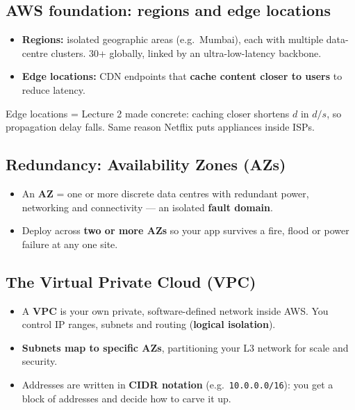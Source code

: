 \subsection{AWS foundation: regions and edge locations}
\begin{itemize}
  \item \textbf{Regions:} isolated geographic areas (e.g.\ Mumbai), each with multiple data-centre clusters. 30+ globally, linked by an ultra-low-latency backbone.
  \item \textbf{Edge locations:} CDN endpoints that \textbf{cache content closer to users} to reduce latency.
\end{itemize}
Edge locations = Lecture 2 made concrete: caching closer shortens $d$ in $d/s$, so propagation delay falls. Same reason Netflix puts appliances inside ISPs.

\subsection{Redundancy: Availability Zones (AZs)}
\begin{itemize}
  \item An \textbf{AZ} = one or more discrete data centres with redundant power, networking and connectivity --- an isolated \textbf{fault domain}.
  \item Deploy across \textbf{two or more AZs} so your app survives a fire, flood or power failure at any one site.
\end{itemize}

\subsection{The Virtual Private Cloud (VPC)}
\begin{itemize}
  \item A \textbf{VPC} is your own private, software-defined network inside AWS. You control IP ranges, subnets and routing (\textbf{logical isolation}).
  \item \textbf{Subnets map to specific AZs}, partitioning your L3 network for scale and security.
  \item Addresses are written in \textbf{CIDR notation} (e.g.\ \texttt{10.0.0.0/16}): you get a block of addresses and decide how to carve it up.
\end{itemize}

